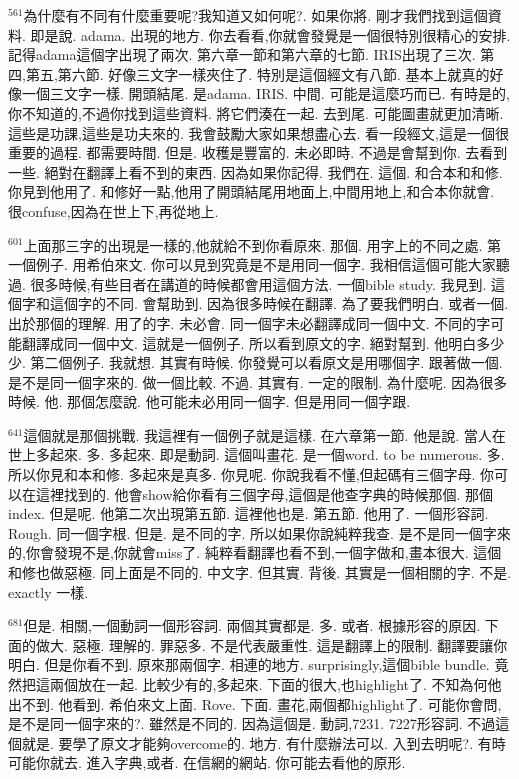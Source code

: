 \documentclass{book}
\begin{document}
$^{561}$為什麼有不同有什麼重要呢?我知道又如何呢?.
如果你將.
剛才我們找到這個資料.
即是說.
adama.
出現的地方.
你去看看,你就會發覺是一個很特別很精心的安排.
記得adama這個字出現了兩次.
第六章一節和第六章的七節.
IRIS出現了三次.
第四,第五,第六節.
好像三文字一樣夾住了.
特別是這個經文有八節.
基本上就真的好像一個三文字一樣.
開頭結尾.
是adama.
IRIS.
中間.
可能是這麼巧而已.
有時是的,你不知道的,不過你找到這些資料.
將它們湊在一起.
去到尾.
可能圖畫就更加清晰.
這些是功課,這些是功夫來的.
我會鼓勵大家如果想盡心去.
看一段經文,這是一個很重要的過程.
都需要時間.
但是.
收穫是豐富的.
未必即時.
不過是會幫到你.
去看到一些.
絕對在翻譯上看不到的東西.
因為如果你記得.
我們在.
這個.
和合本和和修.
你見到他用了.
和修好一點,他用了開頭結尾用地面上,中間用地上,和合本你就會.
很confuse,因為在世上下,再從地上.

$^{601}$上面那三字的出現是一樣的,他就給不到你看原來.
那個.
用字上的不同之處.
第一個例子.
用希伯來文.
你可以見到究竟是不是用同一個字.
我相信這個可能大家聽過.
很多時候,有些目者在講道的時候都會用這個方法.
一個bible study.
我見到.
這個字和這個字的不同.
會幫助到.
因為很多時候在翻譯.
為了要我們明白.
或者一個.
出於那個的理解.
用了的字.
未必會.
同一個字未必翻譯成同一個中文.
不同的字可能翻譯成同一個中文.
這就是一個例子.
所以看到原文的字.
絕對幫到.
他明白多少少.
第二個例子.
我就想.
其實有時候.
你發覺可以看原文是用哪個字.
跟著做一個.
是不是同一個字來的.
做一個比較.
不過.
其實有.
一定的限制.
為什麼呢.
因為很多時候.
他.
那個怎麼說.
他可能未必用同一個字.
但是用同一個字跟.

$^{641}$這個就是那個挑戰.
我這裡有一個例子就是這樣.
在六章第一節.
他是說.
當人在世上多起來.
多.
多起來.
即是動詞.
這個叫畫花.
是一個word.
to be numerous.
多.
所以你見和本和修.
多起來是真多.
你見呢.
你說我看不懂,但起碼有三個字母.
你可以在這裡找到的.
他會show給你看有三個字母,這個是他查字典的時候那個.
那個index.
但是呢.
他第二次出現第五節.
這裡他也是.
第五節.
他用了.
一個形容詞.
Rough.
同一個字根.
但是.
是不同的字.
所以如果你說純粹我查.
是不是同一個字來的,你會發現不是,你就會miss了.
純粹看翻譯也看不到,一個字做和,畫本很大.
這個和修也做惡極.
同上面是不同的.
中文字.
但其實.
背後.
其實是一個相關的字.
不是.
exactly 一樣.

$^{681}$但是.
相關,一個動詞一個形容詞.
兩個其實都是.
多.
或者.
根據形容的原因.
下面的做大.
惡極.
理解的.
罪惡多.
不是代表嚴重性.
這是翻譯上的限制.
翻譯要讓你明白.
但是你看不到.
原來那兩個字.
相連的地方.
surprisingly,這個bible bundle.
竟然把這兩個放在一起.
比較少有的,多起來.
下面的很大,也highlight了.
不知為何他出不到.
他看到.
希伯來文上面.
Rove.
下面.
畫花,兩個都highlight了.
可能你會問,是不是同一個字來的?.
雖然是不同的.
因為這個是.
動詞,7231.
7227形容詞.
不過這個就是.
要學了原文才能夠overcome的.
地方.
有什麼辦法可以.
入到去明呢?.
有時可能你就去.
進入字典,或者.
在信網的網站.
你可能去看他的原形.
\end{document}
